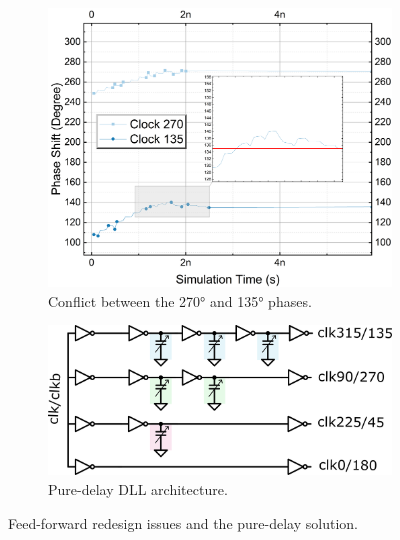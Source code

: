 \setlength{\textfloatsep}{10pt}       %
\setlength{\floatsep}{8pt}            %
\setlength{\intextsep}{8pt}           %
\begin{figure}[tbp]
  \centering
  \begin{subfigure}{0.48\linewidth}
    \centering
    \includegraphics[width=\linewidth]{figures/Results/FF_8out_PNPN-FightExample.png}
    \caption{Conflict between the \ang{270} and \ang{135} phases.}
    \label{fig:FF_8out_225vs135}
  \end{subfigure}\hfill
  \begin{subfigure}{0.48\linewidth}
    \centering
    \includegraphics[width=\linewidth]{figures/Schematics/pure_delay.png}
    \caption{Pure-delay DLL architecture.}
    \label{fig:pure_delay}
  \end{subfigure}
  \caption{Feed-forward redesign issues and the pure-delay solution.}
  \label{fig:redesign_summary}
\end{figure}



